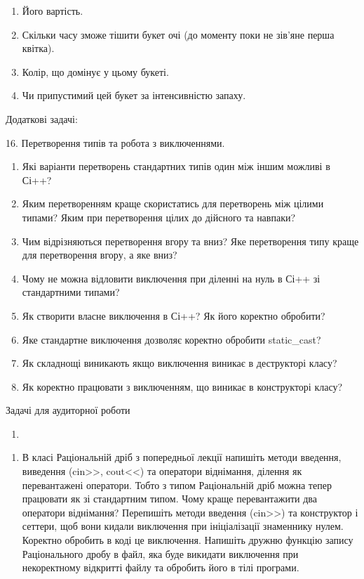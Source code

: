 \documentclass[]{article}
\makeatletter
\newcommand{\xslalph}[1]{\expandafter\@xslalph\csname c@#1\endcsname}
\newcommand{\@xslalph}[1]{%
    \ifcase#1\or а\or б\or в\or г\or д\or e\or є\or ж\or з\or i%
    \or й\or к\or л\or м\or н\or о\or п\or р\or с\or т%
    \or у\or ф\or х\or ц\or ч\or ш\or ю\or я\or аа\or бб\or вв%
    \else\@ctrerr\fi%
}
\makeatother
\begin{document}
\begin{enumerate}
\begin{enumerate}[label=\xslalph*)]
\begin{enumerate}
\begin{enumerate}[label=\xslalph*)]
\begin{enumerate}
\def\labelenumi{\arabic{enumi}.}
\item
  Його вартість.
\item
  Скільки часу зможе тішити букет очі (до моменту поки не зів'яне перша
  квітка).
\item
  Колір, що домінує у цьому букеті.
\item
  Чи припустимий цей букет за інтенсивністю запаху.
\end{enumerate}

Додаткові задачі:

16. Перетворення типів та робота з виключеннями.

\begin{enumerate}
\def\labelenumi{\arabic{enumi})}
\item
  Які варіанти перетворень стандартних типів один між іншим можливі в
  Сі++?
\item
  Яким перетворенням краще скористатись для перетворень між цілими
  типами? Яким при перетворення цілих до дійсного та навпаки?
\item
  Чим відрізняються перетворення вгору та вниз? Яке перетворення типу
  краще для перетворення вгору, а яке вниз?
\item
  Чому не можна відловити виключення при діленні на нуль в Сі++ зі
  стандартними типами?
\item
  Як створити власне виключення в Сі++? Як його коректно обробити?
\item
  Яке стандартне виключення дозволяє коректно обробити static\_cast?
\item
  Як складнощі виникають якщо виключення виникає в деструкторі класу?
\item
  Як коректно працювати з виключенням, що виникає в конструкторі класу?
\end{enumerate}

Задачі для аудиторної роботи

\begin{enumerate}
\def\labelenumi{\arabic{enumi})}
\item
\end{enumerate}

\begin{enumerate}
\def\labelenumi{\arabic{enumi})}
\item
  В класі Раціональній дріб з попередньої лекції напишіть методи
  введення, виведення (cin\textgreater{}\textgreater{},
  cout\textless{}\textless{}) та оператори віднімання, ділення як
  перевантажені оператори. Тобто з типом Раціональній дріб можна тепер
  працювати як зі стандартним типом. Чому краще перевантажити два
  оператори віднімання? Перепишіть методи введення
  (cin\textgreater{}\textgreater{}) та конструктор і сеттери, щоб вони
  кидали виключення при ініціалізації знаменнику нулем. Коректно
  обробить в коді це виключення. Напишіть дружню функцію запису
  Раціонального дробу в файл, яка буде викидати виключення при
  некоректному відкритті файлу та обробить його в тілі програми.
\end{enumerate}


\end{enumerate}
\end{enumerate}
\end{enumerate}
\end{enumerate}
\end{document}
